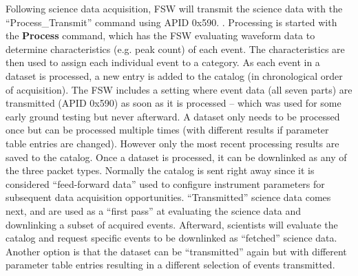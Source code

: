 Following science data acquisition, FSW will transmit the science data with the “Process\_Transmit” command using APID 0x590. . Processing is started with the \textbf{Process} command, which has the FSW evaluating waveform data to determine characteristics (e.g. peak count) of each event. The characteristics are then used to assign each individual event to a category. As each event in a dataset is processed, a new entry is added to the catalog (in chronological order of acquisition). The FSW includes a setting where event data (all seven parts) are transmitted (APID 0x590) as soon as it is processed – which was used for some early ground testing but never afterward.\newline
A dataset only needs to be processed once but can be processed multiple times (with different results if parameter table entries%
are changed).  However only the most recent processing results are saved to the catalog.\newline
Once a dataset is processed, it can be downlinked as any of the three packet types. Normally the catalog is sent right away since it is considered “feed-forward data” used to configure instrument parameters for subsequent data acquisition opportunities. “Transmitted” science data comes next, and are used as a “first pass” at evaluating the science data and downlinking a subset of acquired events. Afterward, scientists will evaluate the catalog and request specific events to be downlinked as “fetched” science data. Another option is that the dataset can be “transmitted” again but with different parameter table entries resulting in a different selection of events transmitted. %
\newline

